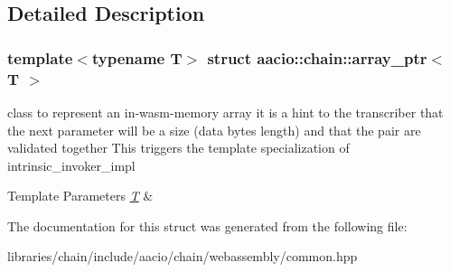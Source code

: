 \subsection{Detailed Description}
\subsubsection*{template$<$typename T$>$\newline
struct aacio\+::chain\+::array\+\_\+ptr$<$ T $>$}

class to represent an in-\/wasm-\/memory array it is a hint to the transcriber that the next parameter will be a size (data bytes length) and that the pair are validated together This triggers the template specialization of intrinsic\+\_\+invoker\+\_\+impl 
\begin{DoxyTemplParams}{Template Parameters}
{\em \mbox{\hyperlink{struct_t}{T}}} & \\
\hline
\end{DoxyTemplParams}


The documentation for this struct was generated from the following file\+:\begin{DoxyCompactItemize}
\item 
libraries/chain/include/aacio/chain/webassembly/common.\+hpp\end{DoxyCompactItemize}
